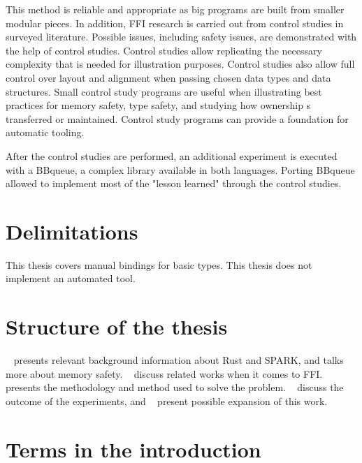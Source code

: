 \documentclass[nomenclature, english, bibtex]{kththesis}
\newcommand*{\generalExpl}[1]{\todo[inline]{#1}}
\newcommand*{\sweExpl}[1]{\todo[inline, backgroundcolor=kth-lightblue40]{#1}}  %
\begin{document}
This method is reliable and appropriate as big programs are built from smaller modular pieces. In addition, FFI research is carried out from control studies in surveyed literature. Possible issues, including safety issues, are demonstrated with the help of control studies. Control studies allow replicating the necessary complexity that is needed for illustration purposes. Control studies also allow full control over layout and alignment when passing chosen data types and data structures.
Small control study programs are useful when illustrating best practices for memory safety, type safety, and studying how ownership s transferred or maintained.
Control study programs can provide a foundation for automatic tooling.

After the control studies are performed, an additional experiment is executed with a BBqueue, a complex library available in both languages. Porting BBqueue allowed to implement most of the "lesson learned" through the control studies.


\section{Delimitations}\sweExpl{Avgränsningar}

This thesis covers manual bindings for basic types. This thesis does not implement an automated tool.

\section{Structure of the thesis}
~ presents relevant background information about Rust and SPARK, and talks more about memory safety.  
~ discuss related works when it comes to \gls{FFI}.   presents the methodology and method used to solve the problem. ~ discuss the outcome of the experiments, and ~ present possible expansion of this work.

\section{Terms in the introduction}\label{sec:introductiongloss}
\renewcommand{\glossarysection}[2][]{}
\printglossary[type=introductiongloss, style=mydefs, 
]
\end{document}
